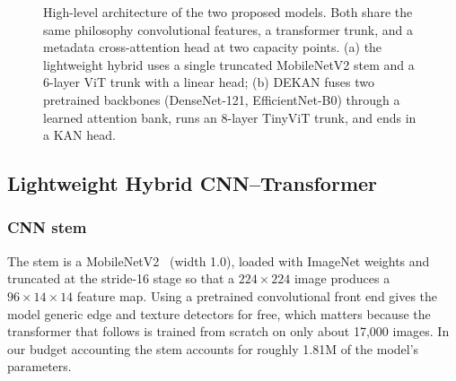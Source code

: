 \begin{figure}[!t]
{%
}
\caption{High-level architecture of the two proposed models. Both share the same
philosophy convolutional features, a transformer trunk, and a metadata
cross-attention head at two capacity points. (a) the lightweight hybrid uses
a single truncated MobileNetV2 stem and a 6-layer ViT trunk with a linear head;
(b) DEKAN fuses two pretrained backbones (DenseNet-121, EfficientNet-B0) through
a learned attention bank, runs an 8-layer TinyViT trunk, and ends in a KAN head.}
\label{fig:arch}
\end{figure}

\subsection{Lightweight Hybrid CNN--Transformer}

\subsubsection{CNN stem}

The stem is a MobileNetV2~\cite{sandler2018mobilenetv2} (width 1.0), loaded with
ImageNet weights and truncated at the stride-16 stage so that a
$224\times224$ image produces a $96\times14\times14$ feature map. Using a
pretrained convolutional front end gives the model generic edge and texture
detectors for free, which matters because the transformer that follows is trained
from scratch on only about 17{,}000 images. In our budget accounting the stem
accounts for roughly 1.81M of the model's parameters.

